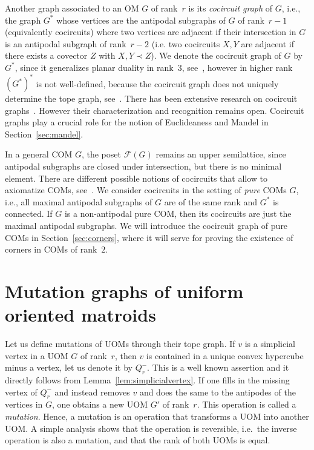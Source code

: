 \documentclass[final,11pt]{article}
\begin{document}
Another graph associated to an OM $G$ of rank~$r$ is its \emph{cocircuit graph} of $G$, i.e., the graph $G^*$ whose vertices are the antipodal subgraphs of $G$ of rank~$r-1$ (equivalently cocircuits) where two vertices are adjacent if their intersection in $G$ is an antipodal subgraph of rank~$r-2$ (i.e. two cocircuits $X,Y$ are adjacent if there exists a covector $Z$ with $X,Y \prec Z$). We denote the cocircuit graph of $G$ by $G^*$, since it generalizes planar duality in rank~$3$, see~\cite{Fuk-93}, however in higher rank~$(G^*)^*$ is not well-defined, because the cocircuit graph does not uniquely determine the tope graph, see~\cite{cordovil2000cocircuit}. There has been extensive research on cocircuit graphs~\cite{bab-01,omax,omcubic,mon-06}. However their characterization and recognition remains open. Cocircuit graphs play a crucial role for the notion of Euclideaness and Mandel in Section~\ref{sec:mandel}.

In a general COM $G$, the poset $\mathcal{F}(G)$ remains an upper semilattice, since antipodal subgraphs are closed under intersection, but there is no minimal element. There are different possible notions of cocircuits that allow to axiomatize COMs, see~\cite{Ban-18}. We consider cocircuits in the setting of \emph{pure} COMs $G$, i.e., all maximal antipodal subgraphs of $G$ are of the same rank and $G^*$ is connected. If $G$ is a non-antipodal pure COM, then its cocircuits are just the maximal antipodal subgraphs. We will introduce the cocircuit graph of pure COMs in Section~\ref{sec:corners}, where it will serve for proving the existence of corners in COMs of rank~$2$.


\section{Mutation graphs of uniform oriented matroids}\label{sec:mut}

  
Let us define mutations of UOMs through their tope graph. If $v$ is a simplicial vertex in a UOM $G$ of rank~$r$, then $v$ is contained in a unique convex hypercube minus a vertex, let us denote it by $Q^-_{r}$. This is a well known assertion and it directly follows from Lemma~\ref{lem:simplicialvertex}. If one fills in the missing vertex of $Q^-_{r}$ and instead removes $v$ and does the same to the antipodes of the vertices in $G$, one obtains a new UOM $G'$ of rank~$r$. This operation is called a \emph{mutation}. Hence, a mutation is an operation that transforms a UOM into another UOM. A simple analysis shows that the operation is reversible, i.e.~the inverse operation is also a mutation, and that the rank of both UOMs is equal. 
\end{document}
